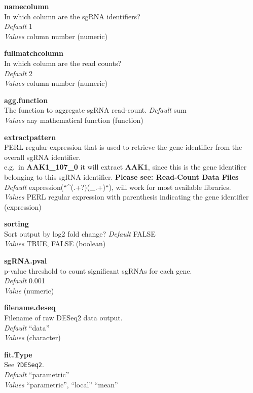 \documentclass[]{article}
\begin{document}
\textbf{namecolumn}\\
In which column are the sgRNA identifiers?\\
\emph{Default} 1\\
\emph{Values} column number (numeric)

\textbf{fullmatchcolumn}\\
In which column are the read counts?\\
\emph{Default} 2\\
\emph{Values} column number (numeric)

\textbf{agg.function}\\
The function to aggregate sgRNA read-count. \emph{Default} sum\\
\emph{Values} any mathematical function (function)

\textbf{extractpattern}\\
PERL regular expression that is used to retrieve the gene identifier
from the overall sgRNA identifier.\\
e.g.~in \textbf{AAK1\_107\_0} it will extract \textbf{AAK1}, since this
is the gene identifier belonging to this sgRNA identifier.
\textbf{Please see: Read-Count Data Files}\\
\emph{Default} expression(``\^{}(.+?)(\_.+)``), will work for most
available libraries.\\
\emph{Values} PERL regular expression with parenthesis indicating the
gene identifier (expression)

\textbf{sorting}\\
Sort output by log2 fold change? \emph{Default} FALSE\\
\emph{Values} TRUE, FALSE (boolean)

\textbf{sgRNA.pval}\\
p-value threshold to count significant sgRNAs for each gene.\\
\emph{Default} 0.001\\
\emph{Value} (numeric)

\textbf{filename.deseq}\\
Filename of raw DESeq2 data output.\\
\emph{Default} ``data''\\
\emph{Values} (character)

\textbf{fit.Type}\\
See \texttt{?DESeq2}.\\
\emph{Default} ``parametric''\\
\emph{Values} ``parametric'', ``local'' ``mean''
\end{document}
